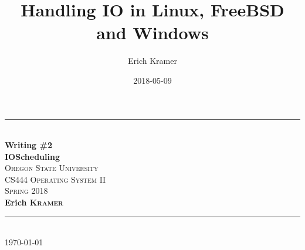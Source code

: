 \documentclass[letterpaper,10pt,notitlepage,fleqn]{article}
\title{Handling IO in Linux, FreeBSD and Windows}
\date{2018-05-09}
\author{Erich Kramer}
\begin{document}
\begin{titlepage}
\vspace*{\fill}

\newcommand{\HRule}{\rule{\linewidth}{0.5mm}} %

\center %


\HRule \\[0.4cm]
{ \huge \bfseries Writing \#2 \\IOScheduling}\\[0.4cm] %


\textsc{\Large Oregon State University}\\[0.5cm] %
\textsc{\Large CS444 Operating System II}\\[0.5cm] %
\textsc{\large Spring 2018}\\[0.5cm] %
        \noindent \textbf{Erich \textsc{Kramer}} \\ %

\HRule \\[1.5cm]

{\large \today}\\[3cm] %




\vfill %



\end{titlepage}
\end{document}
